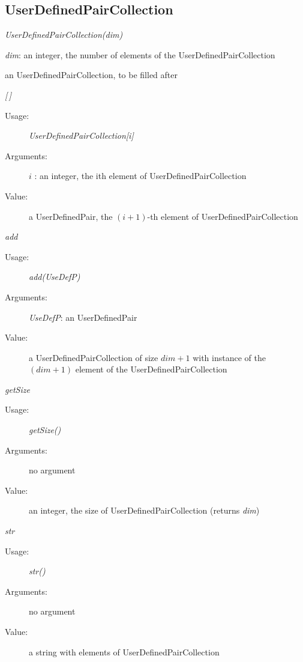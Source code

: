 \newpage
\subsection{UserDefinedPairCollection}

\begin{description}

\item[Usage:] \textit{UserDefinedPairCollection(dim)}

\item[Arguments:]  \textit{dim}: an integer, the number of elements of the UserDefinedPairCollection

\item[Value:] an UserDefinedPairCollection, to be filled after

\item[Some methods :]  \rule{0pt}{1em}

\begin{description}

\item \textit{[\,]}
\begin{description}
\item[Usage:] \textit{UserDefinedPairCollection[i]}
\item[Arguments:] $i$ : an integer, the ith element of UserDefinedPairCollection
\item[Value:] a UserDefinedPair, the $(i+1)$-th element of UserDefinedPairCollection
\end{description}
\bigskip

\item \textit{add}
\begin{description}
\item[Usage:] \textit{add(UseDefP)}
\item[Arguments:] \textit{UseDefP}: an UserDefinedPair
\item[Value:]      a UserDefinedPairCollection of size  $dim +1$
with instance of the $(dim+1)$ element of the UserDefinedPairCollection
\end{description}
\bigskip

\item \textit{getSize}
\begin{description}
\item[Usage:] \textit{getSize()}
\item[Arguments:] no argument
\item[Value:]      an integer, the size of UserDefinedPairCollection (returns \textit{dim})
\end{description}
\bigskip

\item \textit{str}
\begin{description}
\item[Usage:] \textit{str()}
\item[Arguments:] no argument
\item[Value:]   a string with elements of UserDefinedPairCollection
\end{description}

\end{description}
\end{description}

